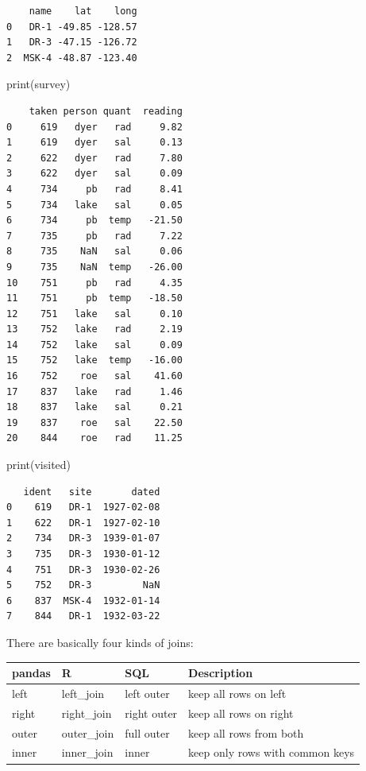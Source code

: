 \documentclass[
  letterpaper,
]{scrbook}
\newenvironment{Shaded}{\begin{snugshade}}{\end{snugshade}}
\newcommand{\BuiltInTok}[1]{#1}
\newcommand{\NormalTok}[1]{#1}
\begin{document}
\begin{verbatim}
    name    lat    long
0   DR-1 -49.85 -128.57
1   DR-3 -47.15 -126.72
2  MSK-4 -48.87 -123.40
\end{verbatim}

\begin{Shaded}
\begin{Highlighting}[]
\BuiltInTok{print}\NormalTok{(survey)}
\end{Highlighting}
\end{Shaded}

\begin{verbatim}
    taken person quant  reading
0     619   dyer   rad     9.82
1     619   dyer   sal     0.13
2     622   dyer   rad     7.80
3     622   dyer   sal     0.09
4     734     pb   rad     8.41
5     734   lake   sal     0.05
6     734     pb  temp   -21.50
7     735     pb   rad     7.22
8     735    NaN   sal     0.06
9     735    NaN  temp   -26.00
10    751     pb   rad     4.35
11    751     pb  temp   -18.50
12    751   lake   sal     0.10
13    752   lake   rad     2.19
14    752   lake   sal     0.09
15    752   lake  temp   -16.00
16    752    roe   sal    41.60
17    837   lake   rad     1.46
18    837   lake   sal     0.21
19    837    roe   sal    22.50
20    844    roe   rad    11.25
\end{verbatim}

\begin{Shaded}
\begin{Highlighting}[]
\BuiltInTok{print}\NormalTok{(visited)}
\end{Highlighting}
\end{Shaded}

\begin{verbatim}
   ident   site       dated
0    619   DR-1  1927-02-08
1    622   DR-1  1927-02-10
2    734   DR-3  1939-01-07
3    735   DR-3  1930-01-12
4    751   DR-3  1930-02-26
5    752   DR-3         NaN
6    837  MSK-4  1932-01-14
7    844   DR-1  1932-03-22
\end{verbatim}

There are basically four kinds of joins:

\begin{longtable}[]{@{}llll@{}}
\toprule
pandas & R & SQL & Description\tabularnewline
\midrule
\endhead
left & left\_join & left outer & keep all rows on left\tabularnewline
right & right\_join & right outer & keep all rows on right\tabularnewline
outer & outer\_join & full outer & keep all rows from both\tabularnewline
inner & inner\_join & inner & keep only rows with common keys\tabularnewline
\bottomrule
\end{longtable}
\end{document}
